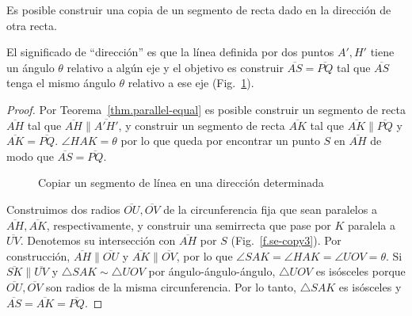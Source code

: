 \begin{theorem}\label{thm.straight-direction}
Es posible construir una copia de un segmento de recta dado en la dirección de otra recta.
\end{theorem}

El significado de ``dirección'' es que la línea definida por dos puntos $A',H'$ tiene un ángulo $\theta$ relativo a algún eje y el objetivo es construir $\overline{AS}=\overline{PQ}$ tal que $\overline{AS}$ tenga el mismo ángulo $\theta$ relativo a ese eje (Fig.~\ref{f.se-copy1}).

\begin{proof}
Por Teorema~\ref{thm.parallel-equal} es posible construir un segmento de recta $\overline{AH}$ tal que $\overline{AH}\parallel\overline{A'H'}$, y construir un segmento de recta $\overline{AK}$ tal que $\overline{AK}\parallel\overline{PQ}$ y $\overline{AK}=\overline{PQ}$.
$\angle HAK=\theta$ por lo que queda por encontrar un punto $S$ en $\overline{AH}$ de modo que $\overline{AS}=\overline{PQ}$.

\begin{figure}[t]
\begin{center}
\end{center}
\caption{Copiar un segmento de línea en una dirección determinada}\label{f.se-copy1}
\end{figure}

Construimos dos radios $\overline{OU}, \overline{OV}$ de la circunferencia fija que sean paralelos a $\overline{AH}, \overline{AK}$, respectivamente, y construir una semirrecta que pase por $K$ paralela a $\overline{UV}$. Denotemos su intersección con $\overline{AH}$ por $S$ (Fig.~\ref{f.se-copy3}). Por construcción, $\overline{AH}\parallel\overline{OU}$ y $\overline{AK}\parallel\overline{OV}$, por lo que $\angle SAK=\angle HAK=\angle UOV=\theta$. Si $\overline{SK}\parallel\overline{UV}$ y $\triangle SAK\sim\triangle UOV$ por ángulo-ángulo-ángulo, $\triangle UOV$ es isósceles porque $\overline{OU}, \overline{OV}$ son radios de la misma circunferencia. Por lo tanto, $\triangle SAK$ es isósceles y $\overline{AS}=\overline{AK}=\overline{PQ}$.
\end{proof}

